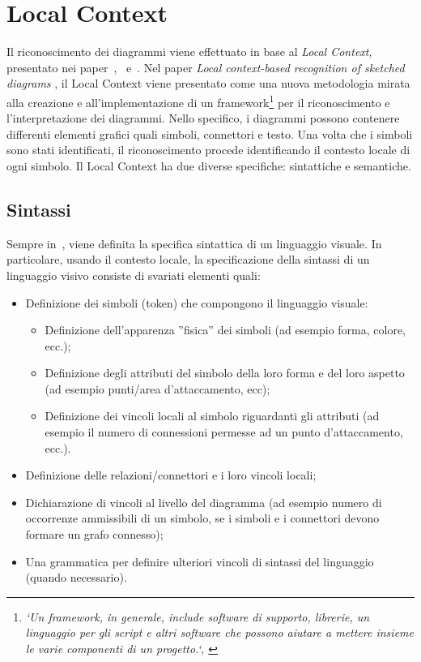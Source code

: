 \chapter{Local Context}\label{ch:localcontext}
    Il riconoscimento dei diagrammi viene effettuato in base al \textit{Local Context}, presentato nei paper~\cite{localcontext_recognition},~\cite{extending_localcontext} e~\cite{localcontext}.
    \newline
    Nel paper \textit{Local context-based recognition of sketched diagrams} \cite{localcontext_recognition}, il Local Context viene presentato come una nuova metodologia mirata alla creazione e all'implementazione di un framework\footnote{\textit{`Un framework, in generale, include software di supporto, librerie, un linguaggio per gli script e altri software che possono aiutare a mettere insieme le varie componenti di un progetto.`, \cite{framework}}} per il riconoscimento e l'interpretazione dei diagrammi. Nello specifico, i diagrammi possono contenere differenti elementi grafici quali simboli, connettori e testo. Una volta che i simboli sono stati identificati, il riconoscimento procede identificando il contesto locale di ogni simbolo.
    Il Local Context ha due diverse specifiche: sintattiche e semantiche.
    \section{Sintassi}
        Sempre in~\cite{localcontext_recognition}, viene definita la specifica sintattica di un linguaggio visuale.
        In particolare, usando il contesto locale, la specificazione della sintassi di un linguaggio visivo consiste di svariati elementi quali:
        \begin{itemize}
            \item Definizione dei simboli (token) che compongono il linguaggio visuale:
            \begin{itemize}
                \item Definizione dell'apparenza ''fisica'' dei simboli (ad esempio forma, colore, ecc.);
                \item Definizione degli attributi del simbolo della loro forma e del loro aspetto (ad esempio punti/area d'attaccamento, ecc);
                \item Definizione dei vincoli locali al simbolo riguardanti gli attributi (ad esempio il numero di connessioni permesse ad un punto d'attaccamento, ecc.).
            \end{itemize}
            \item Definizione delle relazioni/connettori e i loro vincoli locali;
            \item Dichiarazione di vincoli al livello del diagramma (ad esempio numero di occorrenze ammissibili di un simbolo, se i simboli e i connettori devono formare un grafo connesso);
            \item Una grammatica per definire ulteriori vincoli di sintassi del linguaggio (quando necessario).
        \end{itemize}

